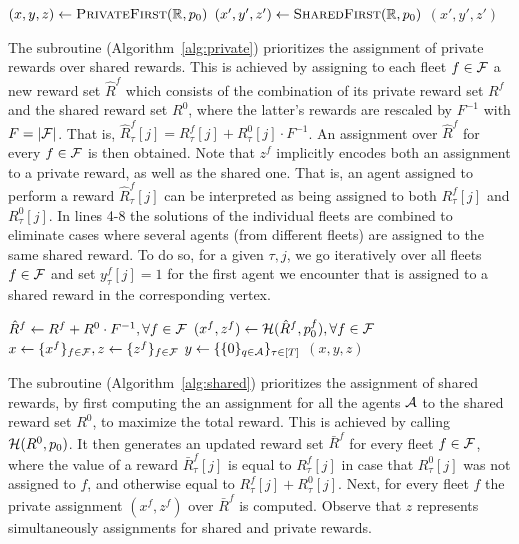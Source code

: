 \documentclass[conference]{IEEEtran}
\begin{document}
\begin{algorithm}[!ht]
  $(x,y,z)\gets \textsc{PrivateFirst}(\mathbb{R},p_0)$\;
  $(x',y',z')\gets \textsc{SharedFirst}(\mathbb{R},p_0)$\;
  \Return $(x',y',z')$\;
  \caption{\alg$(\dR,p_0)$}
  \label{alg:main}
\end{algorithm} 

The subroutine \private (Algorithm~\ref{alg:private}) prioritizes the assignment of private rewards over shared rewards. This is achieved by assigning to each fleet $f\in \mathcal{F}$ a new reward set $\hat{R}^f$ which consists of the combination of its private reward set $R^f$ and the shared reward set $R^0$, where the latter's rewards are rescaled by $F^{-1}$ with $F=|\mathcal{F}|$. That is, $\hat{R}^f_\tau[j]={R}^f_\tau[j]+ {R}^0_\tau[j]\cdot F^{-1}$. An assignment over $\hat{R}^f$ for every $f\in \mathcal{F}$ is then obtained. Note that $z^f$ implicitly encodes both an assignment to a private reward, as well as the shared one. That is, an agent assigned to perform a reward $\hat{R}^f_\tau[j]$ can be interpreted as being assigned to both $R^f_\tau[j]$ and $R^0_\tau[j]$.
In lines 4-8 the solutions of the individual fleets are combined to eliminate cases where several agents (from different fleets) are assigned to the same shared reward. To do so, for a given $\tau,j$, we go iteratively over all fleets $f\in \mathcal{F}$ and set $y^f_\tau[j]=1$ for the first agent we encounter that is assigned to a shared reward in the corresponding vertex. 

\begin{algorithm}[!ht]
  $\hat{R}^f\gets R^f+R^0\cdot F^{-1}, \forall f\in \mathcal{F}$\;
  $(x^f,z^f)\gets \mathcal{H}(\hat{R}^f,p_0^f), \forall f\in \mathcal{F}$\;
  $x\gets \{x^f\}_{f\in \mathcal{F}},z\gets\{z^f\}_{f\in \mathcal{F}}$\;
  $y\gets \{\{0\}_{q\in \mathcal{A}}\}_{\tau \in [T]}$\;
  \Return $(x,y,z)$\;
  \caption{$\private(\dR,p_0)$}
  \label{alg:private}
\end{algorithm} 

The \shared subroutine (Algorithm~\ref{alg:shared}) prioritizes the assignment of shared rewards, by first computing the an assignment for all the agents $\mathcal{A}$ to the shared reward set $R^0$, to maximize the total reward. This is achieved by calling $\mathcal{H}(R^0,p_0)$.  It then generates an updated reward set $\bar{R}^f$ for every fleet $f\in \mathcal{F}$, where the value of a reward $\bar{R}^f_\tau [j]$ is equal to $R^f_\tau [j]$ in case that $R^0_\tau[j]$ was not assigned to $f$, and otherwise equal to $R^f_\tau [j]+R^0_\tau[j]$. Next, for every fleet $f$ the private assignment $(x^f,z^f)$ over $\bar{R}^f$ is computed. Observe that $z$ represents simultaneously assignments for shared and private rewards.
\end{document}
